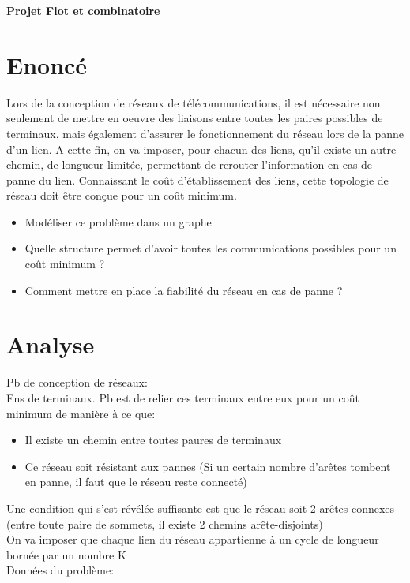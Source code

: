 \documentclass[frenchb]{article}
\begin{document}
		\begin{title}
			\textbf{\huge{Projet Flot et combinatoire}}
		\end{title}
		
		
		\section {Enoncé}
			Lors de la conception de réseaux de télécommunications, il est nécessaire non seulement de mettre en oeuvre des liaisons entre toutes les paires possibles de terminaux, mais également d'assurer le fonctionnement du réseau lors de la panne d'un lien. A cette fin, on va imposer, pour chacun des liens, qu'il existe un autre chemin, de longueur limitée, permettant de rerouter l'information en cas de panne du lien. Connaissant le coût d'établissement des liens, cette topologie de réseau doit être conçue pour un coût minimum.
			\begin{itemize}
				\item{Modéliser ce problème dans un graphe}
				\item{Quelle structure permet d'avoir toutes les communications possibles pour un coût minimum ?}
				\item{Comment mettre en place la fiabilité du réseau en cas de panne ?}
			\end{itemize}
			
			
			\section{Analyse}
				Pb de conception de réseaux:\\
				Ens de terminaux. Pb est de relier ces terminaux entre eux pour un coût minimum de manière à ce que:
				\begin{itemize}
					\item{Il existe un chemin entre toutes paures de terminaux}
					\item{Ce réseau soit résistant aux pannes (Si un certain nombre d'arêtes tombent en panne, il faut que le réseau reste connecté)} 
				\end{itemize}
				
				Une condition qui s'est révélée suffisante est que le réseau soit 2 arêtes connexes (entre toute paire de sommets, il existe 2 chemins arête-disjoints)\\
				
				On va imposer que chaque lien du réseau appartienne à un cycle de longueur bornée par un nombre K\\
				Données du problème:\\
				
\end{document}
